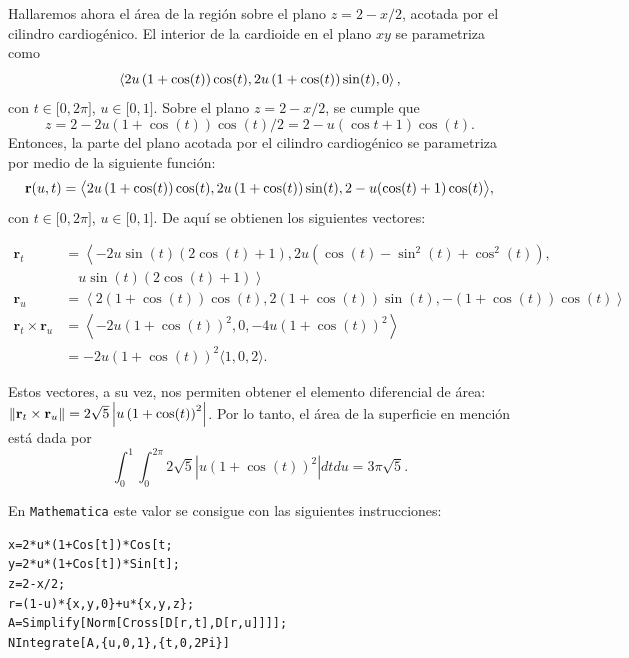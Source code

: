 Hallaremos ahora el área de la región sobre el plano $z=2-x/2$, acotada por el cilindro cardiogénico.
El interior de la cardioide en el plano $xy$ se parametriza como
\[\left \langle 2u\left( 1+\cos(t)\right) \cos(t) ,2u\left( 1+\cos(t)\right) \sin(t),0\right \rangle,\]
con $t\in \lbrack 0,2\pi ]$, $u\in \lbrack 0,1]$.
Sobre el plano $z=2-x/2$, se cumple que
\[z=2-2u\left( 1+\cos(t)\right)\cos(t)/2=2-u\left(\cos t+1\right)\cos(t).\]
Entonces, la parte del plano acotada por el cilindro cardiogénico se parametriza por medio de la siguiente función:
\begin{gather*}
{\bf r}(u,t)=\big\langle 2u\left( 1+\cos(t)\right) \cos(t),2u\left(1+\cos(t)\right)\sin(t),2-u(\cos(t)+1)\cos(t) \big\rangle,
\end{gather*}
con $t\in \lbrack 0,2\pi ]$, $u\in \lbrack 0,1]$. De aquí se obtienen los siguientes vectores:
\begin{small}
\begin{align*}
\mathbf{r}_t &= \left\langle -2u\sin(t)(2\cos(t) + 1), 2u\left(\cos(t) - \sin^2(t) + \cos^2(t)\right), \right. \\
&\quad \left. u\sin(t)(2\cos(t) + 1) \right\rangle \\
\mathbf{r}_u &= \left\langle 2(1 + \cos(t))\cos(t), 2(1 + \cos(t))\sin(t), -(1 + \cos(t))\cos(t) \right\rangle \\
\mathbf{r}_t \times \mathbf{r}_u &= \left\langle -2u(1 + \cos(t))^2, 0, -4u(1 + \cos(t))^2 \right\rangle \\
&= -2u(1 + \cos(t))^2 \langle 1, 0, 2 \rangle.
\end{align*}
\end{small}
Estos vectores, a su vez, nos permiten obtener el elemento diferencial de área:
$\left\|  {\bf r}_{t}\times {\bf r}_{u}\right\|= 2\sqrt{5}\left|u\left( 1+\cos(t)\right)^{2}\right| $. Por lo tanto, el área de la superficie en mención está dada por
\[\int_{0}^{1}\int_{0}^{2\pi }2\sqrt{5}\left| u\left( 1+\cos (t) \right) ^{2}\right|
dtdu= 3\pi \sqrt{5}.\]

En \verb"Mathematica" este valor se consigue con las siguientes instrucciones:

\begin{tcolorbox}[title=\bf Instrucción en \verb"Mathematica"]\begin{Verbatim}[formatcom=\letraverbatim]
x=2*u*(1+Cos[t])*Cos[t;
y=2*u*(1+Cos[t])*Sin[t];
z=2-x/2;
r=(1-u)*{x,y,0}+u*{x,y,z};
A=Simplify[Norm[Cross[D[r,t],D[r,u]]]];
NIntegrate[A,{u,0,1},{t,0,2Pi}]
\end{Verbatim}
\end{tcolorbox}


